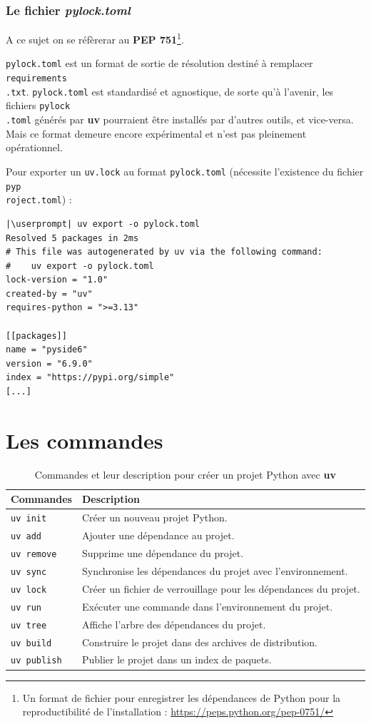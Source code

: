 \subsubsection*{Le fichier \textit{pylock.toml}}
A ce sujet on se réfèrerar au \textbf{PEP 751}\footnote{Un format de fichier pour enregistrer les dépendances de Python pour la reproductibilité de l'installation : \url{https://peps.python.org/pep-0751/}}.

\texttt{pylock.toml} est un format de sortie de résolution destiné à remplacer \texttt{requirements\\.txt}. \texttt{pylock.toml} est standardisé et agnostique, de sorte qu'à l'avenir, les fichiers \texttt{pylock\\.toml} générés par \textbf{uv} pourraient être installés par d'autres outils, et vice-versa. Mais ce format demeure encore expérimental et n'est pas pleinement opérationnel.

Pour exporter un \texttt{uv.lock} au format \texttt{pylock.toml} (nécessite l'existence du fichier \texttt{pyp\\roject.toml}) : 
\begin{lstlisting}[style=bash]
|\userprompt| uv export -o pylock.toml
Resolved 5 packages in 2ms
# This file was autogenerated by uv via the following command:
#    uv export -o pylock.toml
lock-version = "1.0"
created-by = "uv"
requires-python = ">=3.13"

[[packages]]
name = "pyside6"
version = "6.9.0"
index = "https://pypi.org/simple"
[...]
\end{lstlisting}

\section{Les commandes}
\begin{table}[h!]
\centering
\begin{tabular}{|l|p{12cm}|}
\hline
\textbf{Commandes} & \textbf{Description} \\
\hline
\texttt{uv init} & Créer un nouveau projet Python. \\
\hline
\texttt{uv add} & Ajouter une dépendance au projet. \\
\hline
\texttt{uv remove} & Supprime une dépendance du projet. \\
\hline
\texttt{uv sync} & Synchronise les dépendances du projet avec l'environnement. \\
\hline
\texttt{uv lock} & Créer un fichier de verrouillage pour les dépendances du projet. \\
\hline
\texttt{uv run} & Exécuter une commande dans l'environnement du projet. \\
\hline
\texttt{uv tree} & Affiche l'arbre des dépendances du projet. \\
\hline
\texttt{uv build} & Construire le projet dans des archives de distribution. \\
\hline
\texttt{uv publish} & Publier le projet dans un index de paquets. \\
\hline
\end{tabular}
    \caption{Commandes et leur description pour créer un projet Python avec \textbf{uv}}
\end{table}
\bigskip

